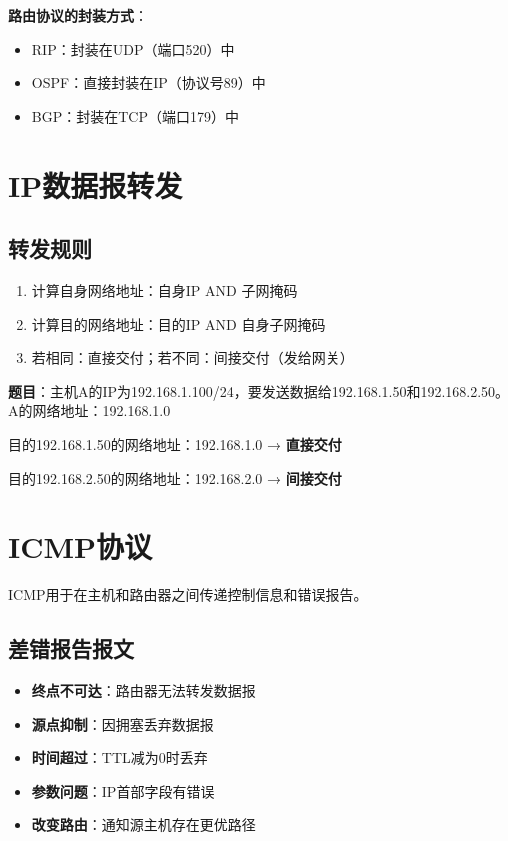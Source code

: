 \begin{notebox}
\textbf{路由协议的封装方式}：
\begin{itemize}[itemsep=0pt]
    \item RIP：封装在UDP（端口520）中
    \item OSPF：直接封装在IP（协议号89）中
    \item BGP：封装在TCP（端口179）中
\end{itemize}
\end{notebox}

\section{IP数据报转发}
\subsection{转发规则}
\begin{enumerate}[leftmargin=2em,itemsep=0pt]
    \item 计算自身网络地址：自身IP AND 子网掩码
    \item 计算目的网络地址：目的IP AND 自身子网掩码
    \item 若相同：直接交付；若不同：间接交付（发给网关）
\end{enumerate}

\begin{examplebox}[例题4.6 IP转发判断]
\textbf{题目}：主机A的IP为192.168.1.100/24，要发送数据给192.168.1.50和192.168.2.50。
\tcblower
A的网络地址：192.168.1.0

目的192.168.1.50的网络地址：192.168.1.0 → \textbf{直接交付}

目的192.168.2.50的网络地址：192.168.2.0 → \textbf{间接交付}
\end{examplebox}

\section{ICMP协议}
ICMP用于在主机和路由器之间传递控制信息和错误报告。

\subsection{差错报告报文}
\begin{itemize}[leftmargin=2em,itemsep=0pt]
    \item \textbf{终点不可达}：路由器无法转发数据报
    \item \textbf{源点抑制}：因拥塞丢弃数据报
    \item \textbf{时间超过}：TTL减为0时丢弃
    \item \textbf{参数问题}：IP首部字段有错误
    \item \textbf{改变路由}：通知源主机存在更优路径
\end{itemize}

